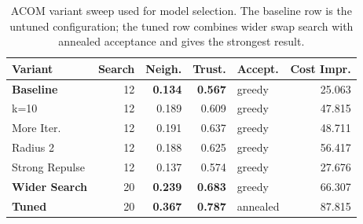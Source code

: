 \begin{table}[!tb]
  \caption{ACOM variant sweep used for model selection. The baseline row is the untuned configuration; the tuned row combines wider swap search with annealed acceptance and gives the strongest result.}
  \label{tab:acom-ablation}
  \centering
  \scriptsize
  \begin{tabular}{lrrrlr}
    \toprule
    Variant & Search & Neigh. & Trust. & Accept. & Cost Impr. \\
    \midrule
    \textbf{Baseline} & 12 & \textbf{0.134} & \textbf{0.567} & greedy & 25.063 \\
    k=10 & 12 & 0.189 & 0.609 & greedy & 47.815 \\
    More Iter. & 12 & 0.191 & 0.637 & greedy & 48.711 \\
    Radius 2 & 12 & 0.188 & 0.625 & greedy & 56.417 \\
    Strong Repulse & 12 & 0.137 & 0.574 & greedy & 27.676 \\
    \textbf{Wider Search} & 20 & \textbf{0.239} & \textbf{0.683} & greedy & 66.307 \\
    \textbf{Tuned} & 20 & \textbf{0.367} & \textbf{0.787} & annealed & 87.815 \\
    \bottomrule
  \end{tabular}
\end{table}

